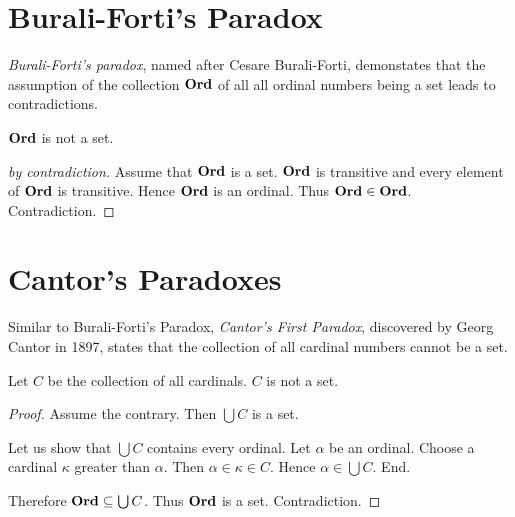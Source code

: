 \documentclass{article}
\begin{document}
  \section*{Burali-Forti's Paradox}

  \emph{Burali-Forti's paradox}, named after Cesare Burali-Forti, demonstates
  that the assumption of the collection $\mathbf{Ord}$ of all all ordinal numbers being
  a set leads to contradictions.

  \begin{forthel}
  \end{forthel}

  \begin{forthel}
    \begin{theorem*}
      $\mathbf{Ord}$ is not a set.
    \end{theorem*}
    \begin{proof}[by contradiction]
      Assume that $\mathbf{Ord}$ is a set.
      $\mathbf{Ord}$ is transitive and every element of $\mathbf{Ord}$ is transitive.
      Hence $\mathbf{Ord}$ is an ordinal.
      Thus $\mathbf{Ord} \in \mathbf{Ord}$.
      Contradiction.
    \end{proof}
  \end{forthel}


  \section*{Cantor's Paradoxes}

  Similar to Burali-Forti's Paradox, \emph{Cantor's First Paradox}, discovered
  by Georg Cantor in 1897, states that the collection of all cardinal numbers
  cannot be a set.

  \begin{forthel}
  \end{forthel}

  \begin{forthel}
    \begin{theorem*}
      Let $C$ be the collection of all cardinals.
      $C$ is not a set.
    \end{theorem*}
    \begin{proof}
      Assume the contrary.
      Then $\bigcup C$ is a set.

      Let us show that $\bigcup C$ contains every ordinal.
        Let $\alpha$ be an ordinal.
        Choose a cardinal $\kappa$ greater than $\alpha$.
        Then $\alpha \in \kappa \in C$.
        Hence $\alpha \in \bigcup C$.
      End.

      Therefore $\mathbf{Ord} \subseteq \bigcup C$.
      Thus $\mathbf{Ord}$ is a set.
      Contradiction.
    \end{proof}
  \end{forthel}
\end{document}
